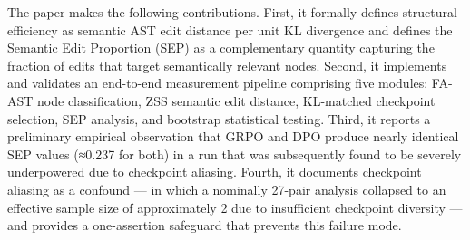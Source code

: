 The paper makes the following contributions. First, it formally defines structural efficiency as semantic AST edit distance per unit KL divergence and defines the Semantic Edit Proportion (SEP) as a complementary quantity capturing the fraction of edits that target semantically relevant nodes. Second, it implements and validates an end-to-end measurement pipeline comprising five modules: FA-AST node classification, ZSS semantic edit distance, KL-matched checkpoint selection, SEP analysis, and bootstrap statistical testing. Third, it reports a preliminary empirical observation that GRPO and DPO produce nearly identical SEP values (≈0.237 for both) in a run that was subsequently found to be severely underpowered due to checkpoint aliasing. Fourth, it documents checkpoint aliasing as a confound — in which a nominally 27-pair analysis collapsed to an effective sample size of approximately 2 due to insufficient checkpoint diversity — and provides a one-assertion safeguard that prevents this failure mode.
